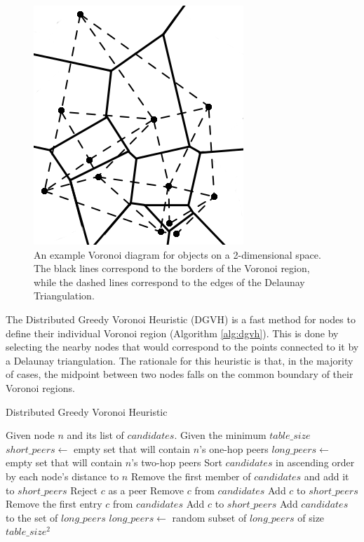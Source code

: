 \begin{figure}
	\centering
	\includegraphics[width=0.5\linewidth]{figs/voronoi}
	\caption[2D Voronoi Example]{An example Voronoi diagram for objects on a 2-dimensional space.  The black lines correspond to the borders of the Voronoi region, while the dashed lines correspond to the edges of the Delaunay Triangulation.}
	\label{voro-ex}
\end{figure}



The Distributed Greedy Voronoi Heuristic (DGVH) is a fast method for nodes to define their individual Voronoi region (Algorithm \ref{alg:dgvh}).
This is done by selecting the nearby nodes that would correspond to the points connected to it by a Delaunay triangulation.
The rationale for this heuristic is that, in the majority of cases, the midpoint between two nodes falls on the common boundary of their Voronoi regions.




\begin{algorithm} %
	\caption{Distributed Greedy Voronoi Heuristic}
	\label{alg:dgvh}
	\begin{algorithmic}[1]  %
		\State Given node $n$ and its list of $candidates$.
		\State Given the minimum $table\_size$
		\State $short\_peers \leftarrow$ empty set that will contain $n$'s one-hop peers
		\State $long\_peers \leftarrow$ empty set that will contain $n$'s two-hop peers
		\State Sort $candidates$ in ascending order by each node's distance to $n$
		\State Remove the first member of $candidates$ and add it to $short\_peers$
		\State Reject $c$ as a peer
		\Else
		\State Remove $c$ from $candidates$
		\State Add $c$ to $short\_peers$
		\EndIf
		\EndFor
		\State Remove the first entry $c$ from $candidates$
		\State Add $c$ to $short\_peers$
		\EndWhile
		\State Add $candidates$ to the set of $long\_peers$
		\State $long\_peers \leftarrow$ random subset of $long\_peers$ of size $table\_size^2$
		\EndIf
	\end{algorithmic}
\end{algorithm}


